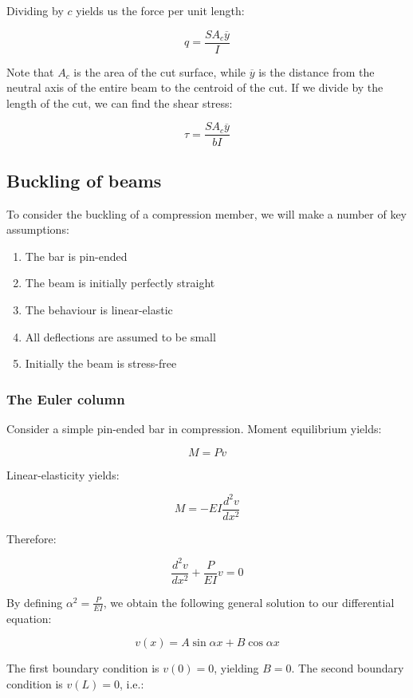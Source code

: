 \documentclass{article}
\begin{document}
Dividing by $c$ yields us the force per unit length:

\[ q = \frac{SA_c\overline{y}}{I} \]

Note that $A_c$ is the area of the cut surface, while $\overline{y}$ is the distance from the neutral axis of the entire beam to the centroid of the cut. If we divide by the length of the cut, we can find the shear stress:

\[ \tau = \frac{SA_c\overline{y}}{bI} \]

\newpage

\subsection{Buckling of beams}

\begin{proposition}[Hypotheses]
    To consider the buckling of a compression member, we will make a number of key assumptions:
    \begin{enumerate}
        \item The bar is pin-ended
        \item The beam is initially perfectly straight
        \item The behaviour is linear-elastic
        \item All deflections are assumed to be small
        \item Initially the beam is stress-free
    \end{enumerate}
\end{proposition}

\subsubsection{The Euler column}

Consider a simple pin-ended bar in compression. Moment equilibrium yields:

\[ M = Pv \]

Linear-elasticity yields:

\[ M = -EI\frac{d^2v}{dx^2} \]

Therefore:

\[ \frac{d^2v}{dx^2} + \frac{P}{EI}v = 0 \]

By defining $\alpha^2 = \frac{P}{EI}$, we obtain the following general solution to our differential equation:

\[ v(x) = A\sin{\alpha x} + B\cos{\alpha x} \]

The first boundary condition is $v(0) = 0$, yielding $B = 0$. The second boundary condition is $v(L) = 0$, i.e.:
\end{document}

